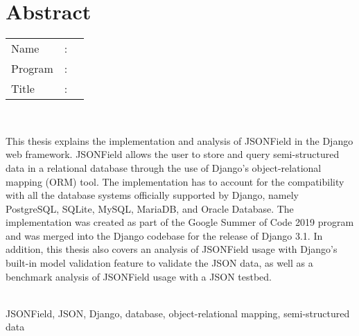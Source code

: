 %
%
%

\chapter*{Abstract}
\singlespacing

\vspace*{0.2cm}

\noindent \begin{tabular}{l l p{11.0cm}}
	Name&: & \penulis \\
	Program&: & \program \\
	Title&: & \judulInggris \\
\end{tabular} \\

\vspace*{0.5cm}

\noindent
This thesis explains the implementation and analysis of JSONField in the Django
web framework. JSONField allows the user to store and query semi-structured
data in a relational database through the use of Django's object-relational
mapping (ORM) tool. The implementation has to account for the compatibility
with all the database systems officially supported by Django, namely
PostgreSQL, SQLite, MySQL, MariaDB, and Oracle Database. The implementation was
created as part of the Google Summer of Code 2019 program and was merged into
the Django codebase for the release of Django 3.1. In addition, this thesis
also covers an analysis of JSONField usage with Django's built-in model
validation feature to validate the JSON data, as well as a benchmark analysis
of JSONField usage with a JSON testbed.\\

\vspace*{0.2cm}

\noindent {} \\
JSONField, JSON, Django, database, object-relational mapping, semi-structured
data \\

\onehalfspacing
\newpage
